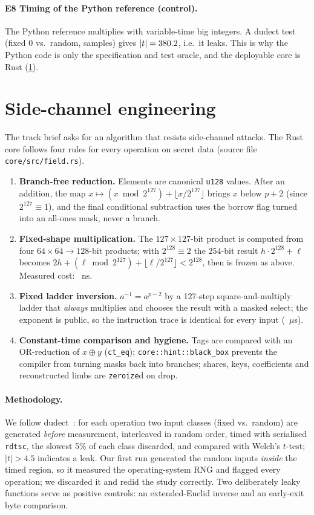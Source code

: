 \documentclass[11pt,a4paper]{article}
\theoremstyle{plain}
\theoremstyle{definition}
\begin{document}
\paragraph{E8 Timing of the Python reference (control).} The Python reference multiplies with
variable-time big integers. A dudect test (fixed $0$ vs.\ random, \EeightN{} samples) gives
$|t|=380.2$, i.e.\ it leaks. This is why the Python code is only the specification and test
oracle, and the deployable core is Rust (\cref{sec:sidechannel}).

\section{Side-channel engineering}\label{sec:sidechannel}

The track brief asks for an algorithm that resists side-channel attacks. The Rust core follows
four rules for every operation on secret data (source file \texttt{core/src/field.rs}).
\begin{enumerate}
  \item \textbf{Branch-free reduction.} Elements are canonical \texttt{u128} values. After an
  addition, the map $x\mapsto (x\bmod 2^{127})+\lfloor x/2^{127}\rfloor$ brings $x$ below $p+2$ (since
  $2^{127}\equiv1$), and the final conditional subtraction uses the borrow flag turned into an
  all-ones mask, never a branch.
  \item \textbf{Fixed-shape multiplication.} The $127\times127$-bit product is computed from four
  $64\times64\to128$-bit products; with $2^{128}\equiv2$ the $254$-bit result $h\cdot2^{128}+\ell$
  becomes $2h+(\ell\bmod2^{127})+\lfloor \ell/2^{127}\rfloor<2^{128}$, then is frozen as above.
  Measured cost: \BenchMul{}~ns.
  \item \textbf{Fixed ladder inversion.} $a^{-1}=a^{p-2}$ by a 127-step square-and-multiply ladder that
  \emph{always} multiplies and chooses the result with a masked select; the exponent is public, so
  the instruction trace is identical for every input (\BenchInv{}~$\mu$s).
  \item \textbf{Constant-time comparison and hygiene.} Tags are compared with an OR-reduction of
  $x\oplus y$ (\texttt{ct\_eq}); \texttt{core::hint::black\_box} prevents the compiler from turning
  masks back into branches; shares, keys, coefficients and reconstructed limbs are
  \texttt{zeroize}d on drop.
\end{enumerate}

\paragraph{Methodology.} We follow dudect~\cite{dudect17}: for each operation two input classes
(fixed vs.\ random) are generated \emph{before} measurement, interleaved in random order, timed
with serialised \texttt{rdtsc}, the slowest 5\% of each class discarded, and compared with Welch's
$t$-test; $|t|>4.5$ indicates a leak. Our first run generated the random inputs \emph{inside} the
timed region, so it measured the operating-system RNG and flagged every operation; we discarded it
and redid the study correctly. Two deliberately leaky functions serve as positive controls: an
extended-Euclid inverse and an early-exit byte comparison.
\end{document}
